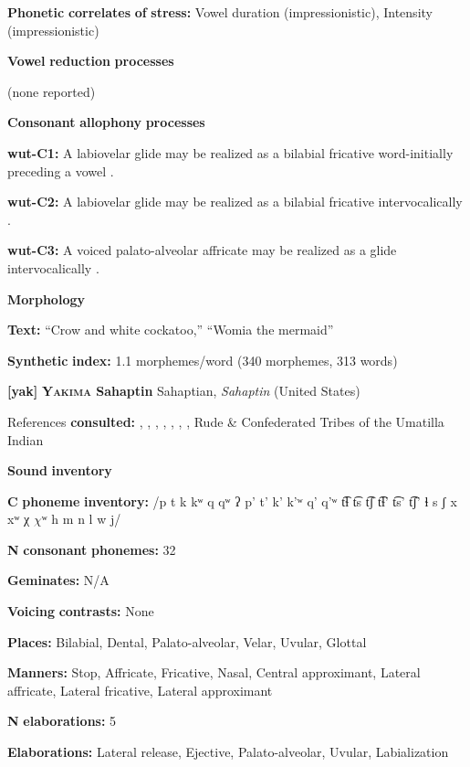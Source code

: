 \begin{styleBody}
\textbf{Phonetic} \textbf{correlates} \textbf{of} \textbf{stress:} Vowel duration (impressionistic), Intensity (impressionistic)

\textbf{Vowel} \textbf{reduction} \textbf{processes}

(none reported)

\textbf{Consonant} \textbf{allophony} \textbf{processes}

\textbf{wut-C1:} A labiovelar glide may be realized as a bilabial fricative word-initially preceding a vowel \citep[57-8]{Marmion2010}.

\textbf{wut-C2:} A labiovelar glide may be realized as a bilabial fricative intervocalically \citep[57-8]{Marmion2010}.

\textbf{wut-C3:} A voiced palato-alveolar affricate may be realized as a glide intervocalically \citep[55]{Marmion2010}.

\textbf{Morphology}

\textbf{Text:} “Crow and white cockatoo,” “Womia the mermaid” \citep[378-382]{Marmion2010}

\textbf{Synthetic} \textbf{index:} 1.1 morphemes/word (340 morphemes, 313 words)

\textbf{[yak]}   \textbf{\textsc{Yakima} \textbf{Sahaptin}}  Sahaptian, \textit{Sahaptin} (United States)

References \textbf{consulted:} \citet{HargusBeavert2002}, \citet{HargusBeavert2005}, \citet{HargusBeavert2006}, \citet{Jansen2010}, \citet{Minthorn2005}, \citet{RigsbyRude1996}, \citet{Rude2009}, Rude \& Confederated Tribes of the Umatilla Indian \citet{Reservation2014}

\textbf{Sound} \textbf{inventory}

\textbf{C} \textbf{phoneme} \textbf{inventory:} /p t k kʷ q qʷ ʔ p’ t’ k’ k’ʷ q’ q’ʷ t͡ɬ t͡s t͡ʃ t͡ɬ’ t͡s’ t͡ʃ’ ɬ s ʃ x xʷ χ $\chi ʷ$ h m n l w j/

\textbf{N} \textbf{consonant} \textbf{phonemes:} 32

\textbf{Geminates:} N/A

\textbf{Voicing} \textbf{contrasts:} None

\textbf{Places:} Bilabial, Dental, Palato-alveolar, Velar, Uvular, Glottal

\textbf{Manners:} Stop, Affricate, Fricative, Nasal, Central approximant, Lateral affricate, Lateral fricative, Lateral approximant

\textbf{N} \textbf{elaborations:} 5

\textbf{Elaborations:} Lateral release, Ejective, Palato-alveolar, Uvular, Labialization


\end{styleBody}
